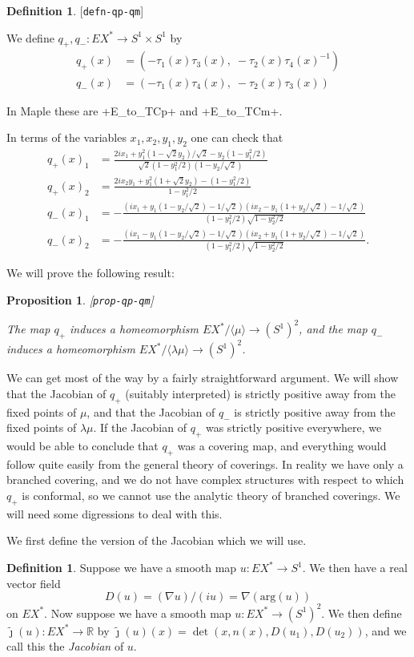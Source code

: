 \documentclass[reqno]{amsart}
\newcommand{\lbl}[1]{\label{#1}\textup{[\texttt{#1}]}\par}
\newcommand{\lbl}{\label}
\newcommand{\lm}        {\lambda}
\newcommand{\R}         {{\mathbb{R}}}
\newcommand{\ip}[1]     {\langle #1\rangle}
\newcommand{\tm}        {\times}
\newcommand{\rt}        {\sqrt{2}}
\newcommand{\tj}	{\widetilde{\jmath}}
\renewcommand{\:}{\colon}
\newtheorem{proposition}[theorem]{Proposition}
\theoremstyle{definition}
\newtheorem{definition}[theorem]{Definition}
\begin{document}
\begin{definition}\lbl{defn-qp-qm}
 We define $q_+,q_-\:EX^*\to S^1\tm S^1$ by
 \begin{align*}
  q_+(x) &= (  -\tau_1(x)\tau_3(x),\;  -\tau_2(x)\tau_4(x)^{-1}) \\
  q_-(x) &= (  -\tau_1(x)\tau_4(x),\;  -\tau_2(x)\tau_3(x))
 \end{align*}
\end{definition}
In Maple these are \mcode+E_to_TCp+ and \mcode+E_to_TCm+.

In terms of the variables $x_1,x_2,y_1,y_2$ one can check that
\begin{align*}
 q_+(x)_1 &= \frac{2ix_1 + y_1^2(1-\rt y_2)/\rt - y_2(1-y_1^2/2)}{
                   \rt(1-y_1^2/2)(1-y_2/\rt)} \\
 q_+(x)_2 &= \frac{2ix_2y_1 + y_1^2(1+\rt y_2) - (1-y_1^2/2)}{
                   1-y_1^2/2} \\
 q_-(x)_1 &= -\frac{(ix_1+y_1(1-y_2/\rt) - 1/\rt)
                    (ix_2-y_1(1+y_2/\rt) - 1/\rt)}{
                    (1-y_1^2/2)\sqrt{1-y_2^2/2}} \\
 q_-(x)_2 &= -\frac{(ix_1-y_1(1-y_2/\rt) - 1/\rt)
                    (ix_2+y_1(1+y_2/\rt) - 1/\rt)}{
                    (1-y_1^2/2)\sqrt{1-y_2^2/2}}.
\end{align*}

We will prove the following result:

\begin{proposition}\lbl{prop-qp-qm}
 The map $q_+$ induces a homeomorphism $EX^*/\ip{\mu}\to(S^1)^2$,
 and the map $q_-$ induces a homeomorphism $EX^*/\ip{\lm\mu}\to(S^1)^2$.
\end{proposition}

We can get most of the way by a fairly straightforward argument.  We
will show that the Jacobian of $q_+$ (suitably interpreted) is
strictly positive away from the fixed points of $\mu$, and that the
Jacobian of $q_-$ is strictly positive away from the fixed points of
$\lm\mu$.  If the Jacobian of $q_+$ was strictly positive everywhere,
we would be able to conclude that $q_+$ was a covering map, and
everything would follow quite easily from the general theory of
coverings.  In reality we have only a branched covering, and we do not
have complex structures with respect to which $q_+$ is conformal, so
we cannot use the analytic theory of branched coverings.  We will need
some digressions to deal with this.

We first define the version of the Jacobian which we will use.
\begin{definition}
 Suppose we have a smooth map $u\:EX^*\to S^1$.  We then have a real
 vector field
 \[ D(u)=(\nabla u)/(iu) = \nabla(\text{arg}(u)) \]
 on $EX^*$.  Now suppose we have a smooth map $u\:EX^*\to(S^1)^2$.  We
 then define $\tj(u)\:EX^*\to\R$ by
 $\tj(u)(x)=\det(x,n(x),D(u_1),D(u_2))$, and we call this the
 \emph{Jacobian} of $u$.
\end{definition}
\end{document}
